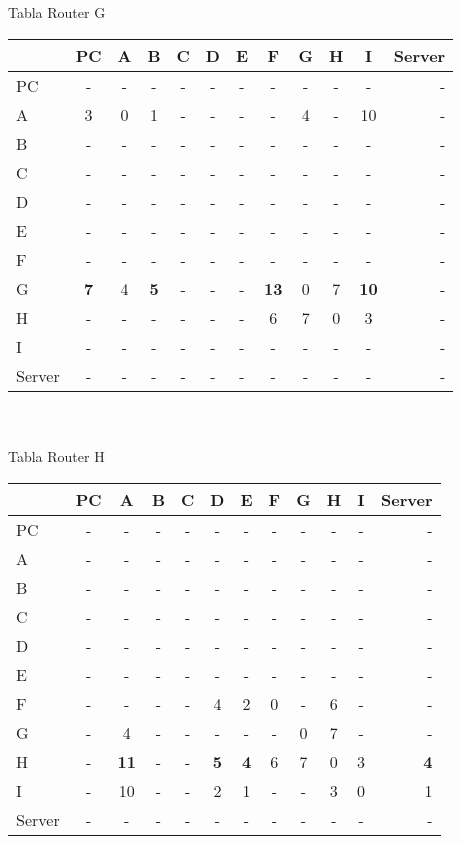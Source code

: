 \documentclass{article}
\begin{document}
\\
\\
Tabla Router G \\
\begin{tabular}{l*{10}{c}r}
              & PC & A & B & C & D & E & F & G & H & I & Server \\
\hline
PC             & - & - & - & - & - & - & - & - & - & - & -\\
A              & 3 & 0 & 1 & - & - & - & - & 4 & - & 10 & -\\
B              & - & - & - & - & - & - & - & - & - & - & -\\
C              & - & - & - & - & - & - & - & - & - & - & -\\
D              & - & - & - & - & - & - & - & - & - & - & -\\
E              & - & - & - & - & - & - & - & - & - & - & -\\
F              & - & - & - & - & - & - & - & - & - & - & -\\
G              &\bf{7}& 4 &\bf{5}& - & - & - &\bf{13}& 0 & 7 &\bf{10}& -\\
H              & - & - & - & - & - & - & 6 & 7 & 0 & 3 & -\\
I              & - & - & - & - & - & - & - & - & - & - & -\\
Server         & - & - & - & - & - & - & - & - & - & - & -\\

\end{tabular}
\\
\\
Tabla Router H \\
\begin{tabular}{l*{10}{c}r}
              & PC & A & B & C & D & E & F & G & H & I & Server \\
\hline
PC             & - & - & - & - & - & - & - & - & - & - & - \\
A              & - & - & - & - & - & - & - & - & - & - & - \\
B              & - & - & - & - & - & - & - & - & - & - & - \\
C              & - & - & - & - & - & - & - & - & - & - & - \\
D              & - & - & - & - & - & - & - & - & - & - & - \\
E              & - & - & - & - & - & - & - & - & - & - & - \\
F              & - & - & - & - & 4 & 2 & 0 & - & 6 & - & - \\
G              & - & 4 & - & - & - & - & - & 0 & 7 & - & - \\
H              & - &\bf{11}& - & - &\bf{5}&\bf{4}& 6 & 7 & 0 & 3 &\bf{4}\\
I              & - & 10 & - & - & 2 & 1 & - & - & 3 & 0 & 1\\
Server         & - & - & - & - & - & - & - & - & - & - & - \\

\end{tabular}
\end{document}
